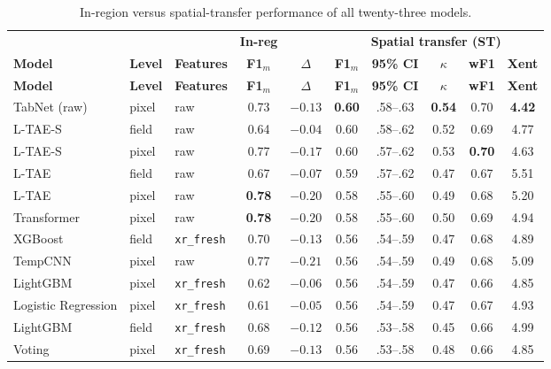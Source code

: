 \documentclass[preprint,authoryear]{elsarticle}
\begin{document}
\begingroup
\scriptsize
\renewcommand{\arraystretch}{1.1}
\setlength{\tabcolsep}{4pt}
\begin{longtable}{lllccccccc}
\caption{In-region versus spatial-transfer performance of all twenty-three models.}
\label{tab:gap}\\
\toprule
 & & & \textbf{In-reg} & & \multicolumn{5}{c}{\textbf{Spatial transfer (ST)}} \\
\cmidrule(lr){4-4}\cmidrule(lr){6-10}
\textbf{Model} & \textbf{Level} & \textbf{Features} & \textbf{F1$_m$} & \textbf{$\Delta$} & \textbf{F1$_m$} & \textbf{95\% CI} & \textbf{$\kappa$} & \textbf{wF1} & \textbf{Xent} \\
\midrule
\endfirsthead
\toprule
\textbf{Model} & \textbf{Level} & \textbf{Features} & \textbf{F1$_m$} & \textbf{$\Delta$} & \textbf{F1$_m$} & \textbf{95\% CI} & \textbf{$\kappa$} & \textbf{wF1} & \textbf{Xent} \\
\midrule
\endhead
\bottomrule
\endfoot
TabNet (raw)          & pixel & raw & 0.73 & $-0.13$ & \textbf{0.60} & .58--.63 & \textbf{0.54} & 0.70 & \textbf{4.42} \\
L-TAE-S               & field & raw & 0.64 & $\mathbf{-0.04}$ & 0.60 & .58--.62 & 0.52 & 0.69 & 4.77 \\
L-TAE-S               & pixel & raw & 0.77 & $-0.17$ & 0.60 & .57--.62 & 0.53 & \textbf{0.70} & 4.63 \\
L-TAE                 & field & raw & 0.67 & $-0.07$ & 0.59 & .57--.62 & 0.47 & 0.67 & 5.51 \\
L-TAE                 & pixel & raw & \textbf{0.78} & $-0.20$ & 0.58 & .55--.60 & 0.49 & 0.68 & 5.20 \\
Transformer           & pixel & raw & \textbf{0.78} & $-0.20$ & 0.58 & .55--.60 & 0.50 & 0.69 & 4.94 \\
XGBoost               & field & \texttt{xr\_fresh} & 0.70 & $-0.13$ & 0.56 & .54--.59 & 0.47 & 0.68 & 4.89 \\
TempCNN               & pixel & raw & 0.77 & $-0.21$ & 0.56 & .54--.59 & 0.49 & 0.68 & 5.09 \\
LightGBM              & pixel & \texttt{xr\_fresh} & 0.62 & $-0.06$ & 0.56 & .54--.59 & 0.47 & 0.66 & 4.85 \\
Logistic Regression   & pixel & \texttt{xr\_fresh} & 0.61 & $-0.05$ & 0.56 & .54--.59 & 0.47 & 0.67 & 4.93 \\
LightGBM              & field & \texttt{xr\_fresh} & 0.68 & $-0.12$ & 0.56 & .53--.58 & 0.45 & 0.66 & 4.99 \\
Voting                & pixel & \texttt{xr\_fresh} & 0.69 & $-0.13$ & 0.56 & .53--.58 & 0.48 & 0.66 & 4.85 \\

\end{longtable}
\end{document}
